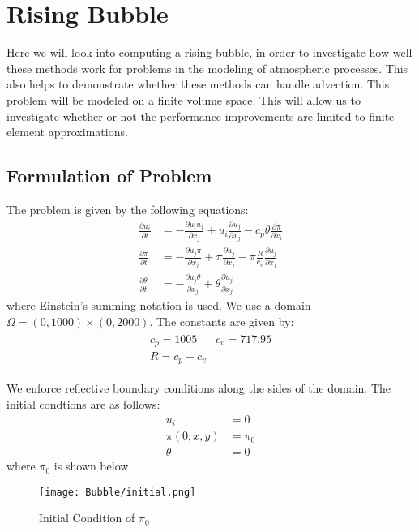 \section{Rising Bubble}

Here we will look into computing a rising bubble, in order to investigate how well these methods work for problems in the modeling of atmospheric processes.
This also helps to demonstrate whether these methods can handle advection.
This problem will be modeled on a finite volume space.
This will allow us to investigate whether or not the performance improvements are limited to finite element approximations.
\subsection{Formulation of Problem}
The problem is given by the following equations\cite{Bryan2002}:
\begin{align*}
    \frac{\partial u_i}{\partial t} &= -\frac{\partial u_i u_j}{\partial x_j} + u_i\frac{\partial u_j}{\partial x_j} - c_p \theta \frac{\partial \pi}{\partial x_i} \\
    \frac{\partial \pi}{\partial t} &= -\frac{\partial u_j \pi}{\partial x_j} + \pi\frac{\partial u_j}{\partial x_j} - \pi \frac{R}{c_v}\frac{\partial u_j}{\partial x_j} \\
    \frac{\partial \theta}{\partial t} &= -\frac{\partial u_j \theta}{\partial x_j} + \theta\frac{\partial u_j}{\partial x_j}
\end{align*}
where Einstein's summing notation is used.
We use a domain $\Omega = (0,1000) \times (0,2000)$.
The constants are given by:
\begin{align*}
    \begin{matrix}
    c_p = 1005 & c_v = 717.95 \\
    R = c_p - c_v 
    \end{matrix}
\end{align*}

We enforce reflective boundary conditions along the sides of the domain.
The initial condtions are as follows:
\begin{align*}
    u_i &= 0\\
    \pi(0,x,y) &= \pi_0\\
    \theta &= 0
\end{align*}
where $\pi_0$ is shown below
\begin{figure}[H]
    \centering
    \begin{minipage}{1\textwidth}
        \texttt{[image: Bubble/initial.png]} %
        \caption{Initial Condition of $\pi_0$}
        \label{fig:first order 8 0.5}
    \end{minipage}
\end{figure}
